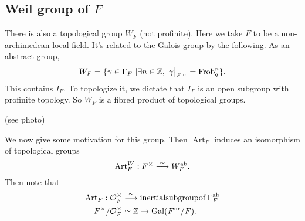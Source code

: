 \subsection{Weil group of $F$} There is also a topological group $W_F$ (not
profinite). Here we take $F$ to be a non-archimedean local field. It's related
to the Galois group by the following. As an abstract group, \[
  W_F = \{ \gamma \in \Gamma_F \ | \exists n \in \ints, \ \restr{\gamma}{F^{\operatorname{nr}}} =
  \operatorname{Frob}_q^n \}. \]
This contains $I_F$. To topologize it, we dictate that $I_F$ is an open subgroup
with profinite topology. So $W_F$ is a fibred product of topological groups. 

(see photo)

We now give some motivation for this group. Then $\operatorname{Art}_F$ induces
an isomorphism of topological groups \[ \operatorname{Art}_F^W : F^\times \stackrel{\sim}{\longrightarrow}
W_F^{\operatorname{ab}}. \] Then note that
\begin{align*}
  \operatorname{Art}_F : \mathcal{O}_F^\times & \stackrel{\sim}{\longrightarrow} \operatorname{inertial
  subgroup of } \Gamma_F^{\operatorname{ab}} \\ F^\times/\mathcal{O}_F^\times &
  \simeq \mathbb{Z} \rightarrow \mathrm{Gal}{(F^{\operatorname{nr}} / F)}.
\end{align*}

